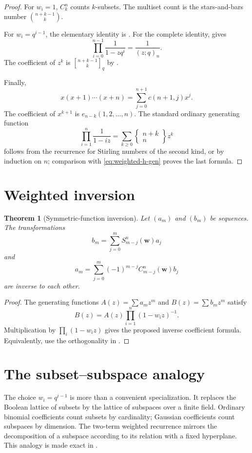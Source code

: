 \documentclass[11pt,oneside,openany]{book}
\newtheorem{theorem}{Theorem}[chapter]
\theoremstyle{definition}
\theoremstyle{remark}
\newcommand{\qbinom}[2]{\genfrac{[}{]}{0pt}{}{#1}{#2}_{q}}
\begin{document}
\begin{proof}
For $w_i=1$, $C_k^n$ counts $k$-subsets.  The multiset count is the stars-and-bars number $\binom{n+k-1}{k}$.

For $w_i=q^{i-1}$, the elementary identity is .  For the complete identity,  gives
\[
 \prod_{i=0}^{n-1}\frac1{1-zq^i}
 =\frac1{(z;q)_n}.
\]
The coefficient of $z^k$ is $\qbinom{n+k-1}{k}$ by .

Finally,
\[
 x(x+1)\cdots(x+n)=\sum_{j=0}^{n+1}c(n+1,j)x^j.
\]
The coefficient of $x^{k+1}$ is $e_{n-k}(1,2,\dots,n)$.  The standard ordinary generating function
\[
 \prod_{i=1}^{n}\frac1{1-iz}
 =\sum_{k\ge0}\left\{\begin{matrix}n+k\\n\end{matrix}\right\}z^k
\]
follows from the recurrence for Stirling numbers of the second kind, or by induction on $n$; comparison with \eqref{eq:weighted-h-gen} proves the last formula.
\end{proof}

\section{Weighted inversion}

\begin{theorem}[Symmetric-function inversion]\label{thm:weighted-inversion}
Let $(a_m)$ and $(b_m)$ be sequences.  The transformations
\[
 b_m=\sum_{j=0}^{m}S_{m-j}^n(\mathbf w)a_j
\]
and
\[
 a_m=\sum_{j=0}^{m}(-1)^{m-j}C_{m-j}^n(\mathbf w)b_j
\]
are inverse to each other.
\end{theorem}

\begin{proof}
The generating functions $A(z)=\sum a_mz^m$ and $B(z)=\sum b_mz^m$ satisfy
\[
 B(z)=A(z)\prod_{i=1}^{n}(1-w_i z)^{-1}.
\]
Multiplication by $\prod_i(1-w_i z)$ gives the proposed inverse coefficient formula.  Equivalently, use the orthogonality in .
\end{proof}

\section{The subset--subspace analogy}

The choice $w_i=q^{i-1}$ is more than a convenient specialization.  It replaces the Boolean lattice of subsets by the lattice of subspaces over a finite field.  Ordinary binomial coefficients count subsets by cardinality; Gaussian coefficients count subspaces by dimension.  The two-term weighted recurrence mirrors the decomposition of a subspace according to its relation with a fixed hyperplane.  This analogy is made exact in .
\end{document}

